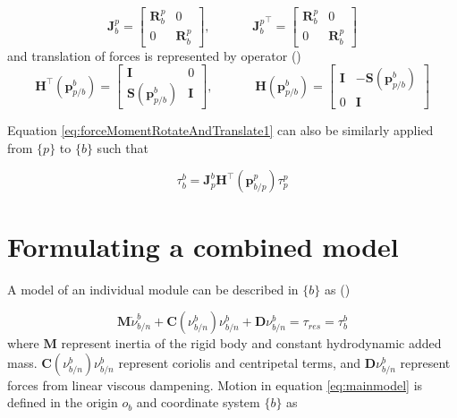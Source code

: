 \begin{equation}
	\textbf{J}_{b}^{p} = \begin{bmatrix} \textbf{R}_{b}^{p} & 0 \\[10pt] 
	0 & \textbf{R}_{b}^{p}\end{bmatrix}, \;\;\;\;\;\;\;\;\;\;\;\; {\textbf{J}_{b}^{p}}^\top = \begin{bmatrix} \textbf{R}_{b}^{p} & 0 \\[10pt] 
	0 & \textbf{R}_{b}^{p}\end{bmatrix}
	\label{eq:operatorJrotation}
\end{equation} 
and translation of forces is represented by operator (\citet{fossen2011handbook})
\begin{equation}
	\textbf{H}^\top (\textbf{p}_{p/b}^{b}) = \begin{bmatrix} \textbf{I} & 0 \\[10pt] 
	\textbf{S}(\textbf{p}_{p/b}^{b}) & \textbf{I}\end{bmatrix}, \;\;\;\;\;\;\;\;\;\;\;\; \textbf{H}(\textbf{p}_{p/b}^{b}) = \begin{bmatrix} \textbf{I} & -\textbf{S}(\textbf{p}_{p/b}^{b}) \\[10pt] 
	0 & \textbf{I}\end{bmatrix}
	\label{eq:operatorHTranslation}
\end{equation}

Equation \ref{eq:forceMomentRotateAndTranslate1} can also be similarly applied from $\{p\}$ to $\{b\}$ such that 

\begin{equation}
\tau_{b}^{b} = 
\textbf{J}_{p}^{b} \textbf{H}^\top (\textbf{p}_{b/p}^{p})  \tau_{p}^{p}
\label{eq:forceMomentRotateAndTranslate2}
\end{equation}


\section{Formulating a combined model}

A model of an individual module can be described in $\{b\}$ as (\citet{fossen2011handbook})

\begin{equation}
	\textbf{M} \dot{\nu}_{b/n}^{b} + \textbf{C}(\nu_{b/n}^{b})\nu_{b/n}^{b} + \textbf{D}\nu_{b/n}^{b} = \tau_{res} = \tau_{b}^{b}
	\label{eq:mainmodel}
\end{equation}
where $ \textbf{M}$ represent inertia of the rigid body and constant hydrodynamic added mass. $\textbf{C}(\nu_{b/n}^{b})\nu_{b/n}^{b}$ represent coriolis and centripetal terms, and $\textbf{D}\nu_{b/n}^{b}$ represent forces from linear viscous dampening. Motion in equation \ref{eq:mainmodel} is defined in the origin $o_{b}$ and coordinate system $\{b\}$ as

